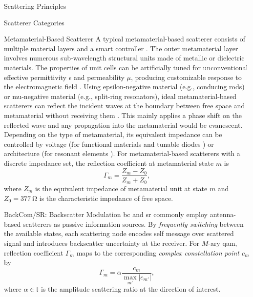 \documentclass[journal]{IEEEtran}
\begin{document}
\begin{section}{Scattering Principles}
\begin{subsection}{Scatterer Categories}
\begin{subsubsection}{Metamaterial-Based Scatterer}
			A typical metamaterial-based scatterer consists of multiple material layers and a smart controller \cite{Wu2020}.
			The outer metamaterial layer involves numerous sub-wavelength structural units made of metallic or dielectric materials.
			The properties of unit cells can be artificially tuned for unconventional effective permittivity $\epsilon$ and permeability $\mu$, producing customizable response to the electromagnetic field \cite{Zhou2021}.
			Using epsilon-negative material (e.g., conducing rods) or mu-negative material (e.g., split-ring resonators), ideal metamaterial-based scatterers can reflect the incident waves at the boundary between free space and metamaterial without receiving them \cite{Huang2021a}.
			This mainly applies a phase shift on the reflected wave and any propagation into the metamaterial would be evanescent.
			Depending on the type of metamaterial, its equivalent impedance can be controlled by voltage (for functional materials \cite{Singh2020} and tunable diodes \cite{Costa2021}) or architecture (for resonant elements \cite{Bialkowski2008}).
			For metamaterial-based scatterers with a discrete impedance set, the reflection coefficient at metamaterial state $m$ is
			\begin{equation}
				\Gamma_m = \frac{Z_m - Z_0}{Z_m + Z_0},
				\label{eq:reflection_pattern_metamaterial}
			\end{equation}
			where $Z_m$ is the equivalent impedance of metamaterial unit at state $m$ and $Z_0 = \qty{377}{\ohm}$ is the characteristic impedance of free space.
		\end{subsubsection}
	\end{subsection}

	\begin{subsection}{BackCom/SR: Backscatter Modulation}
		\gls{bc} and \gls{sr} commonly employ antenna-based scatterers as passive information sources.
		By \emph{frequently switching} between the available states, each scattering node encodes self message over scattered signal and introduces backscatter uncertainty at the receiver.
		For $M$-ary \gls{qam}, reflection coefficient $\Gamma_m$ maps to the corresponding \emph{complex constellation point $c_m$} by
		\begin{equation}
			\Gamma_m = \alpha \frac{c_m}{\max_{m'} \lvert c_{m'} \rvert},
			\label{eq:backscatter_modulation}
		\end{equation}
		where $\alpha \in \mathbb{I}$ is the amplitude scattering ratio at the direction of interest.
	\end{subsection}


\end{section}
\end{document}
